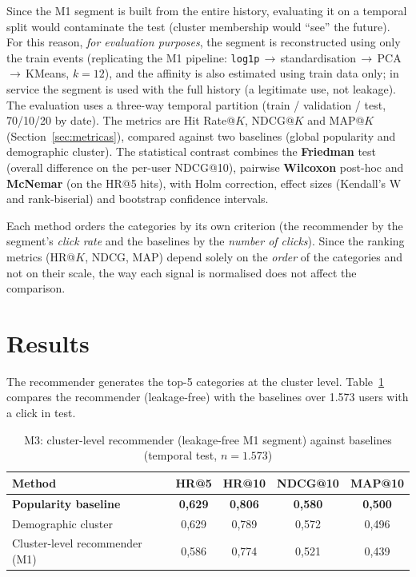 Since the M1 segment is built from the entire history, evaluating it on a temporal split would contaminate the test (cluster membership would ``see'' the future). For this reason, \emph{for evaluation purposes}, the segment is reconstructed using only the train events (replicating the M1 pipeline: \texttt{log1p}\,$\rightarrow$\,standardisation\,$\rightarrow$\,PCA\,$\rightarrow$\,KMeans, $k{=}12$), and the affinity is also estimated using train data only; in service the segment is used with the full history (a legitimate use, not leakage). The evaluation uses a three-way temporal partition (train / validation / test, 70/10/20 by date). The metrics are Hit Rate@$K$, NDCG@$K$ and MAP@$K$ (Section~\ref{sec:metricas}), compared against two baselines (global popularity and demographic cluster). The statistical contrast combines the \textbf{Friedman} test (overall difference on the per-user NDCG@10), pairwise \textbf{Wilcoxon} post-hoc and \textbf{McNemar} (on the HR@5 hits), with Holm correction, effect sizes (Kendall's W and rank-biserial) and bootstrap confidence intervals.

Each method orders the categories by its own criterion (the recommender by the segment's \emph{click rate} and the baselines by the \emph{number of clicks}). Since the ranking metrics (HR@$K$, NDCG, MAP) depend solely on the \emph{order} of the categories and not on their scale, the way each signal is normalised does not affect the comparison.

\section{Results}

The recommender generates the top-5 categories at the cluster level. Table~\ref{tab:m3_results} compares the recommender (leakage-free) with the baselines over 1.573 users with a click in test.

\begin{table}[htbp]
\centering
\caption{M3: cluster-level recommender (leakage-free M1 segment) against baselines (temporal test, $n=1.573$)}
\label{tab:m3_results}
\begin{tabular}{lcccc}
\toprule
\textbf{Method} & \textbf{HR@5} & \textbf{HR@10} & \textbf{NDCG@10} & \textbf{MAP@10} \\
\midrule
\textbf{Popularity baseline}                & \textbf{0,629} & \textbf{0,806} & \textbf{0,580} & \textbf{0,500} \\
Demographic cluster                        & 0,629 & 0,789 & 0,572 & 0,496 \\
Cluster-level recommender (M1)             & 0,586 & 0,774 & 0,521 & 0,439 \\
\bottomrule
\end{tabular}
\end{table}


